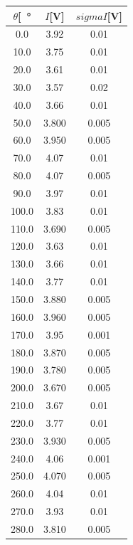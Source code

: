 \documentclass[10pt,oneside,a4paper]{article}
\begin{document}
\begin{minipage}[t]{.5\linewidth}
\begin{center}
\label{tab:align}
\begin{tabular}{|c|c|c|}
\toprule
$\theta$[\SI{}{\degree} &  $I$[V] &  $sigma{I}$[V] \\
\midrule
0.0 &    3.92 &            0.01 \\
10.0 &    3.75 &            0.01 \\
20.0 &    3.61 &            0.01 \\
30.0 &    3.57 &            0.02 \\
40.0 &    3.66 &            0.01 \\
50.0 &    3.800 &            0.005 \\
60.0 &    3.950 &            0.005 \\
70.0 &    4.07 &            0.01 \\
80.0 &    4.07 &            0.005 \\
90.0 &    3.97 &            0.01 \\
100.0 &    3.83 &            0.01 \\
110.0 &    3.690 &            0.005 \\
120.0 &    3.63 &            0.01 \\
130.0 &    3.66 &            0.01 \\
140.0 &    3.77 &            0.01 \\
150.0 &    3.880 &            0.005 \\
160.0 &    3.960 &            0.005 \\
170.0 &    3.95 &            0.001 \\
180.0 &    3.870 &            0.005 \\
190.0 &    3.780 &            0.005 \\
200.0 &    3.670 &            0.005 \\
210.0 &    3.67 &            0.01 \\
220.0 &    3.77 &            0.01 \\
230.0 &    3.930 &            0.005 \\
240.0 &    4.06 &            0.001 \\
250.0 &    4.070 &            0.005 \\
260.0 &    4.04 &            0.01 \\
270.0 &    3.93 &            0.01 \\
280.0 &    3.810 &            0.005 \\

\end{tabular}
\end{center}
\end{minipage}
\end{document}

